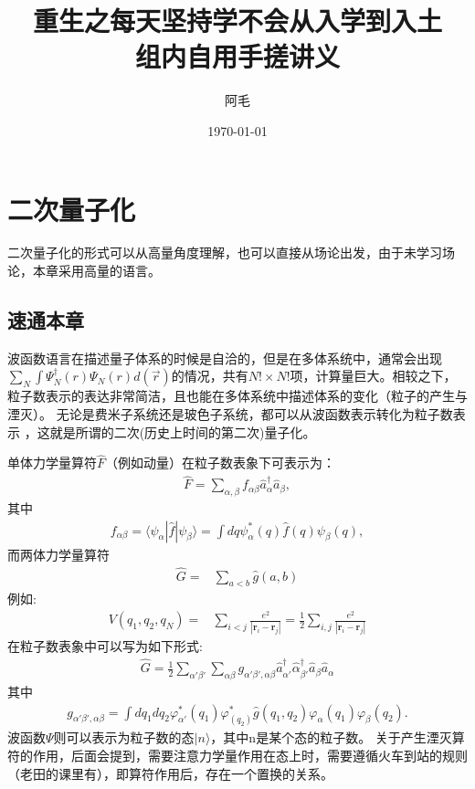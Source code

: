 \documentclass[12pt, a4paper, oneside, UTF8]{ctexbook}
\begin{document}
\title{重生之每天坚持学不会从入学到入土\\组内自用手搓讲义}
\author{阿毛}
\date{\today}
\maketitle

\chapter{二次量子化}
二次量子化的形式可以从高量角度理解，也可以直接从场论出发，由于未学习场论，本章采用高量的语言。

\section{速通本章}
波函数语言在描述量子体系的时候是自洽的，但是在多体系统中，通常会出现
$\sum_N \int\Psi_N^{\dag}(r)\Psi_N(r) d(\vec{r})$的情况，共有$N!\times N!$项，计算量巨大。相较之下，
粒子数表示的表达非常简洁，且也能在多体系统中描述体系的变化（粒子的产生与湮灭）。
无论是费米子系统还是玻色子系统，都可以从波函数表示转化为粒子数表示
，这就是所谓的二次(历史上时间的第二次)量子化。

单体力学量算符$\hat{F}$（例如动量）在粒子数表象下可表示为：
\begin{eqnarray*}
    \hat{F}=\sum_{\alpha,\beta}f_{\alpha\beta}\hat{a}^{\dag}_\alpha\hat{a}_\beta,
\end{eqnarray*}
其中
\begin{eqnarray*}
    f_{\alpha\beta}=\langle\psi_\alpha|\hat{f}|\psi_\beta\rangle=\int dq \psi^{*}_\alpha(q)\hat{f}(q)\psi_\beta(q),
\end{eqnarray*}
而两体力学量算符
\begin{align}
    \hat{G}=&\sum_{a<b}\hat{g}(a,b)
\end{align}
例如:
\begin{align}
    V(q_1,q_2,q_N)=&\sum_{i<j}\frac{e^2}{|\mathbf{r}_i-\mathbf{r}_j|}=
    \frac{1}{2}\sum_{i,j}\frac{e^2}{|\mathbf{r}_i-\mathbf{r}_j|}
\end{align}
在粒子数表象中可以写为如下形式:
\begin{align}
    \hat{G}=\frac{1}{2}\sum_{\alpha'\beta'}\sum_{\alpha\beta}
    g_{\alpha'\beta',\alpha\beta}\hat{a}^{\dag}_{\alpha'}\hat{\alpha}^{\dag}_{\beta'}\hat{a}_\beta\hat{a}_\alpha
\end{align}
其中
\begin{eqnarray}
    g_{\alpha'\beta',\alpha\beta}=\int dq_1 dq_2 \varphi^*_{\alpha'}(q_1)\varphi^*_(q_2)\hat{g}(q_1,q_2)\varphi_\alpha(q_1)\varphi_\beta(q_2).
\end{eqnarray}
波函数$\Psi$则可以表示为粒子数的态$|n\rangle$，其中n是某个态的粒子数。
关于产生湮灭算符的作用，后面会提到，需要注意力学量作用在态上时，需要遵循火车到站的规则（老田的课里有），即算符作用后，存在一个置换的关系。
\end{document}
